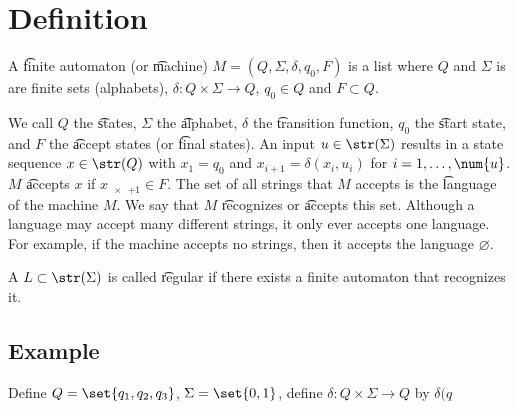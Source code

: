 
\section*{Definition}

A \t{finite automaton} (or \t{machine}) $M = (Q, \Sigma , \delta , q_0, F)$ is a list where $Q$ and $\Sigma $ is are finite sets (alphabets), $\delta : Q \times \Sigma  \to Q$, $q_0 \in Q$ and $F \subset Q$.

We call $Q$ the \t{states}, $\Sigma $ the \t{alphabet}, $\delta $ the \t{transition function}, $q_0$ the \t{start state}, and $F$ the \t{accept states} (or \t{final states}).
An input $u \in \str(\Sigma )$ results in a state sequence $x \in \str(Q)$ with $x_1 = q_0$ and $x_{i+1} = \delta (x_i, u_i)$ for $i = 1, \dots , \num{u}$.
$M$ \t{accepts} $x$ if $x_{\num{x}+1} \in F$.
The set of all strings that $M$ accepts is the \t{language} of the machine $M$.
We say that $M$ \t{recognizes} or \t{accepts} this set.
Although a language may accept many different strings, it only ever accepts one language.
For example, if the machine accepts no strings, then it accepts the language $\varnothing$.

A $L \subset \str(\Sigma )$ is called \t{regular} if there exists a finite automaton that recognizes it.

\subsection*{Example}

Define $Q = \set{q_1, q_2, q_3}$, $\Sigma  = \set{0, 1}$, define $\delta : Q \times \Sigma  \to Q$ by $\delta (q$

\blankpage